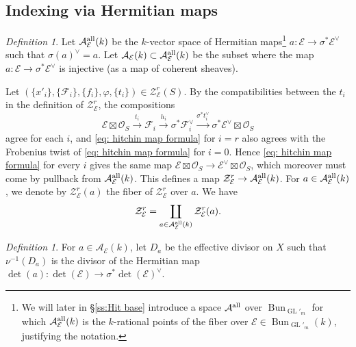 \documentclass[reqno]{amsart}
\numberwithin{equation}{section}
\newcommand{\Cal}[1]{\mathcal{#1}}
\newcommand{\co}{\colon}
\DeclareMathOperator{\GL}{GL}
\DeclareMathOperator{\Bun}{Bun}
\newcommand{\WZ}[1]{{\color{blue} {#1}}}
\newcommand{\s}{\sigma}
\newcommand\cA{\mathcal{A}}
\newcommand\cE{\mathcal{E}}
\newcommand\cO{\mathcal{O}}
\newcommand\cZ{\mathcal{Z}}
\theoremstyle{remark}
\newtheorem{defn}[thm]{Definition}
\numberwithin{equation}{section}
\begin{document}
\subsection{Indexing via Hermitian maps}\label{ssec: sht index by a} 
\begin{defn}\label{def: A(k)}Let $\Cal{A}^{\rm all}_{\Cal{E}}(k)$ be the $k$-vector space of Hermitian maps\footnote{We will later in \S\ref{ss:Hit base} introduce a space $\Cal{A}^{\rm all}$ over $\Bun_{\GL'_m}$ for which $\Cal{A}^{\rm all}_{\Cal{E}}(k)$ is the $k$-rational points of the fiber over $\cE\in \Bun_{\GL'_m}(k)$, justifying the notation.} $a \co \Cal{E} \rightarrow \sigma^* \Cal{E}^{\vee}$ such that $\sigma(a)^{\vee} =a$. Let $\Cal{A}_{\Cal{E}}(k)\subset \Cal{A}^{\rm all}_{\Cal{E}}(k)$ be the subset where the map $a \co \Cal{E} \rightarrow \sigma^* \Cal{E}^{\vee}$ is injective (as a map of coherent sheaves). 
\end{defn}

Let $(\{x'_i\}, \{\Cal{F}_i\}, \{f_i\}, \varphi, \{t_i\}) \in \Cal{Z}_{\Cal{E}}^r(S)$. By the compatibilities between the $t_i$ in the definition of $\Cal{Z}_{\Cal{E}}^r$, the compositions 
\begin{equation}\label{eq: hitchin map formula}
\Cal{E} \boxtimes \cO_S \xrightarrow{t_i} \Cal{F}_i \xrightarrow{h_i} \sigma^* \Cal{F}_i^{\vee} \xrightarrow{\sigma^* t^{\vee}_{i}} \sigma^* \Cal{E}^{\vee} \boxtimes \cO_S
\end{equation}
agree for each $i$, and \eqref{eq: hitchin map formula} for $i=r$ also agrees with the Frobenius twist of \eqref{eq: hitchin map formula} for $i=0$. Hence \eqref{eq: hitchin map formula} for every $i$ gives the same map $\Cal{E} \boxtimes \cO_S  \rightarrow \Cal{E}^{\vee} \boxtimes \cO_S$, which moreover must come by pullback from $\Cal{A}^{\rm all}_{\Cal{E}}(k)$. This defines a map $\Cal{Z}_{\Cal{E}}^{r} \rightarrow \Cal{A}^{\rm all}_{\Cal{E}}(k)$. For $a \in \Cal{A}^{\rm all}_{\Cal{E}}(k)$, we denote by $\Cal{Z}^{r}_{\Cal{E}}(a)$ the fiber of $\Cal{Z}^{r}_{\Cal{E}}$ over $a$. We have
\begin{equation*}
\cZ_{\cE}^{r}=\coprod_{a\in \cA^{\rm all}_{\cE}(k)} \cZ^{r}_{\cE}(a).
\end{equation*}


\begin{defn}\label{def:Da}
For $a\in \cA_{\cE}(k)$, let $D_{a}$ be the effective divisor on $X$ such that $\nu^{-1}(D_{a})$ is the divisor of the Hermitian map $\det(a): \det(\cE)\to \s^{*}\det(\cE)^{\vee}$.
\end{defn}
\end{document}
